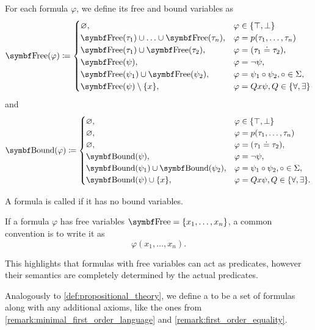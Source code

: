 \begin{definition}
  For each formula \( \varphi \), we define its free and bound variables as
  \begin{align*}
    \Bold{Free}(\varphi) \coloneqq \begin{cases}
      \varnothing,                                              &\varphi \in \{ \top, \bot \} \\
      \Bold{Free}(\tau_1) \cup \ldots \cup \Bold{Free}(\tau_n), &\varphi = p(\tau_1, \ldots, \tau_n) \\
      \Bold{Free}(\tau_1) \cup \Bold{Free}(\tau_2),             &\varphi = (\tau_1 \doteq \tau_2), \\
      \Bold{Free}(\psi),                                        &\varphi = \neg \psi, \\
      \Bold{Free}(\psi_1) \cup \Bold{Free}(\psi_2),             &\varphi = \psi_1 \circ \psi_2, \circ \in \Sigma, \\
      \Bold{Free}(\psi) \setminus \{ x \},                      &\varphi = Q x \psi, Q \in \{ \forall, \exists \}
    \end{cases}
  \end{align*}
  and
  \begin{align*}
    \Bold{Bound}(\varphi) \coloneqq \begin{cases}
      \varnothing,                                              &\varphi \in \{ \top, \bot \} \\
      \varnothing,                                              &\varphi = p(\tau_1, \ldots, \tau_n) \\
      \varnothing,                                              &\varphi = (\tau_1 \doteq \tau_2), \\
      \Bold{Bound}(\psi),                                       &\varphi = \neg \psi, \\
      \Bold{Bound}(\psi_1) \cup \Bold{Bound}(\psi_2),           &\varphi = \psi_1 \circ \psi_2, \circ \in \Sigma, \\
      \Bold{Bound}(\psi) \cup \{ x \},                          &\varphi = Q x \psi, Q \in \{ \forall, \exists \}.
    \end{cases}
  \end{align*}

  A formula is called  if it has no bound variables.

  If a formula \( \varphi \) has free variables \( \Bold{Free} = \{ x_1, \ldots, x_n \} \), a common convention is to write it as
  \begin{equation*}
    \varphi(x_1, \ldots, x_n).
  \end{equation*}

  This highlights that formulas with free variables can act as predicates, however their semantics are completely determined by the actual predicates.

  Analogously to \cref{def:propositional_theory}, we define a  to be a set of formulas along with any additional axioms, like the ones from \cref{remark:minimal_first_order_language} and \cref{remark:first_order_equality}.
\end{definition}

